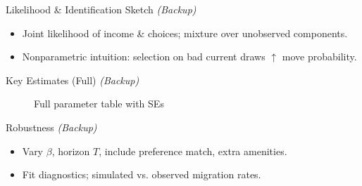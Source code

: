 \documentclass[aspectratio=169,professionalfonts]{beamer}
\newcommand{\figph}[2][0.9\linewidth]{%
  \begin{figure}
    \centering
    \fbox{\rule{0pt}{0.55#1}\rule{#1}{0pt}}%
    \caption{#2}
  \end{figure}
}
\newcommand{\figph}[1]{\begin{center}\fbox{\parbox{0.85\linewidth}{\centering \vspace{0.6em} \textit{#1} \vspace{0.6em}}}\end{center}}
\begin{document}
\begin{frame}{Likelihood \& Identification Sketch \textit{(Backup)}}
  \begin{itemize}
    \item Joint likelihood of income \& choices; mixture over unobserved components.
    \item Nonparametric intuition: selection on bad current draws $\uparrow$ move probability.
  \end{itemize}
\end{frame}

\begin{frame}{Key Estimates (Full) \textit{(Backup)}}
  \figph{Full parameter table with SEs}
\end{frame}

\begin{frame}{Robustness \textit{(Backup)}}
  \begin{itemize}
    \item Vary $\beta$, horizon $T$, include preference match, extra amenities.
    \item Fit diagnostics; simulated vs. observed migration rates.
  \end{itemize}
\end{frame}
\end{document}
